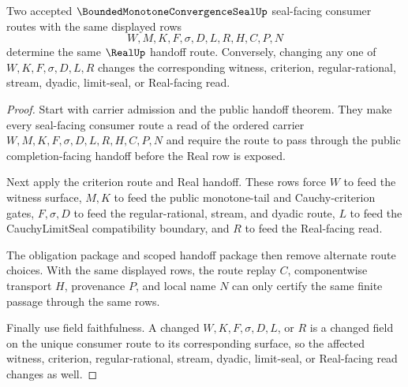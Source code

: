 \begin{theorem}
\label{thm:bounded-monotone-convergence-seal-route-determinacy}
Two accepted $\BoundedMonotoneConvergenceSealUp$ seal-facing consumer routes with the same displayed rows
$$
W,M,K,F,\sigma,D,L,R,H,C,P,N
$$
determine the same $\RealUp$ handoff route. Conversely, changing any one of $W,K,F,\sigma,D,L,R$ changes the corresponding witness, criterion, regular-rational, stream, dyadic, limit-seal, or Real-facing read.
\end{theorem}
\begin{proof}
Start with carrier admission and the public handoff theorem. They make every seal-facing consumer route a read of the ordered carrier $W,M,K,F,\sigma,D,L,R,H,C,P,N$ and require the route to pass through the public completion-facing handoff before the Real row is exposed.

Next apply the criterion route and Real handoff. These rows force $W$ to feed the witness surface, $M,K$ to feed the public monotone-tail and Cauchy-criterion gates, $F,\sigma,D$ to feed the regular-rational, stream, and dyadic route, $L$ to feed the CauchyLimitSeal compatibility boundary, and $R$ to feed the Real-facing read.

The obligation package and scoped handoff package then remove alternate route choices. With the same displayed rows, the route replay $C$, componentwise transport $H$, provenance $P$, and local name $N$ can only certify the same finite passage through the same rows.

Finally use field faithfulness. A changed $W,K,F,\sigma,D,L$, or $R$ is a changed field on the unique consumer route to its corresponding surface, so the affected witness, criterion, regular-rational, stream, dyadic, limit-seal, or Real-facing read changes as well.
\end{proof}

